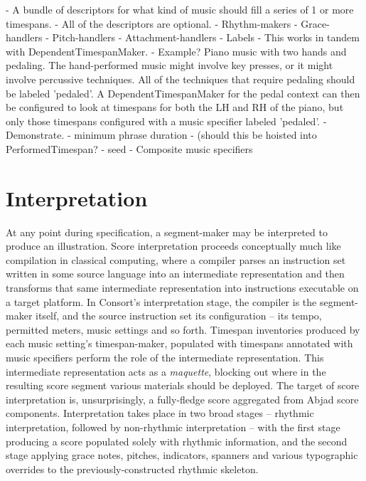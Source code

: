 \begin{markdown}
-   A bundle of descriptors for what kind of music should fill a series of
    1 or more timespans.
-   All of the descriptors are optional.
-   Rhythm-makers
-   Grace-handlers
-   Pitch-handlers
-   Attachment-handlers
-   Labels
    -   This works in tandem with DependentTimespanMaker.
    -   Example? Piano music with two hands and pedaling. The
        hand-performed music might involve key presses, or it might involve
        percussive techniques. All of the techniques that require pedaling
        should be labeled 'pedaled'. A DependentTimespanMaker for the pedal
        context can then be configured to look at timespans for both the LH
        and RH of the piano, but only those timespans configured with a
        music specifier labeled 'pedaled'.
    -   Demonstrate.
-   minimum phrase duration
    -   (should this be hoisted into PerformedTimespan?
-   seed
-   Composite music specifiers
\end{markdown}

\section{Interpretation}
\label{sec:interpretation}

At any point during specification, a segment-maker may be interpreted to
produce an illustration. Score interpretation proceeds conceptually much like
compilation in classical computing, where a compiler parses an instruction set
written in some source language into an intermediate representation and then
transforms that same intermediate representation into instructions executable
on a target platform. In Consort's interpretation stage, the compiler is the
segment-maker itself, and the source instruction set its configuration -- its
tempo, permitted meters, music settings and so forth. Timespan inventories
produced by each music setting's timespan-maker, populated with timespans
annotated with music specifiers perform the role of the intermediate
representation. This intermediate representation acts as a \emph{maquette},
blocking out where in the resulting score segment various materials should be
deployed. The target of score interpretation is, unsurprisingly, a fully-fledge
score aggregated from Abjad score components. Interpretation takes place in two
broad stages -- rhythmic interpretation, followed by non-rhythmic
interpretation -- with the first stage producing a score populated solely with
rhythmic information, and the second stage applying grace notes, pitches,
indicators, spanners and various typographic overrides to the
previously-constructed rhythmic skeleton.

